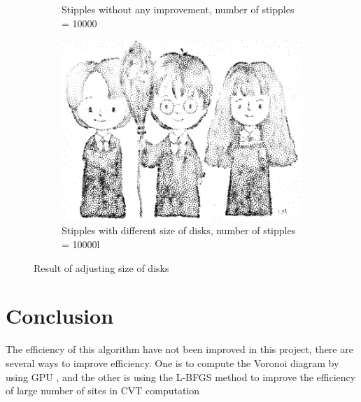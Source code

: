\documentclass[11pt]{article}
\begin{document}
\begin{figure}[h!]
\begin{subfigure}[b]{0.4\linewidth}
		\caption{Stipples without any improvement, number of stipples = 10000}
	\end{subfigure}
	\begin{subfigure}[b]{0.4\linewidth}
		\includegraphics[width=\linewidth]{harry1_contrast.png}
		\caption{Stipples with different size of disks, number of stipples = 10000l}
	\end{subfigure}
	\caption{Result of adjusting size of disks}
	\label{fig:4}
\end{figure}

\section{Conclusion}
The efficiency of this algorithm have not been improved in this project, there are several ways to improve efficiency. One is to compute the Voronoi diagram by using GPU \cite{fastVor}, and the other is using the L-BFGS method to improve the efficiency of large number of sites in CVT computation \cite{lbfgs}


\end{document}
